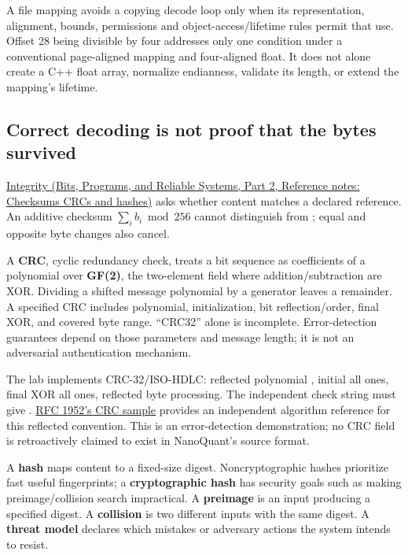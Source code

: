A file mapping avoids a copying decode loop only when its representation, alignment, bounds, permissions and object-access/lifetime rules permit that use. Offset 28 being divisible by four addresses only one condition under a conventional page-aligned mapping and four-aligned float. It does not alone create a C++ float array, normalize endianness, validate its length, or extend the mapping's lifetime.

\subsection{Correct decoding is not proof that the bytes survived}\label{05-engine-i-ch002-correct-decoding-is-not-proof-that-the-bytes-survived}

\hypertarget{05-engine-i-ch002-correct-decoding-is-not-proof-that-the-bytes-survived}{}

\href{../01-Bits-Programs-and-Reliable-Systems-P02/main.pdf\#nameddest=appendix-ed338677de0a}{Integrity (Bits, Programs, and Reliable Systems, Part 2, Reference notes: Checksums CRCs and hashes)} asks whether content matches a declared reference. An additive checksum \(\sum_i b_i\bmod256\) cannot distinguish  from ; equal and opposite byte changes also cancel.

A \textbf{CRC}, cyclic redundancy check, treats a bit sequence as coefficients of a polynomial over \textbf{GF(2)}, the two-element field where addition/subtraction are XOR. Dividing a shifted message polynomial by a generator leaves a remainder. A specified CRC includes polynomial, initialization, bit reflection/order, final XOR, and covered byte range. ``CRC32'' alone is incomplete. Error-detection guarantees depend on those parameters and message length; it is not an adversarial authentication mechanism.

The lab implements CRC-32/ISO-HDLC: reflected polynomial , initial all ones, final XOR all ones, reflected byte processing. The independent check string  must give . \href{https://www.rfc-editor.org/rfc/rfc1952\#section-8}{RFC 1952's CRC sample} provides an independent algorithm reference for this reflected convention. This is an error-detection demonstration; no CRC field is retroactively claimed to exist in NanoQuant's source format.

A \textbf{hash} maps content to a fixed-size digest. Noncryptographic hashes prioritize fast useful fingerprints; a \textbf{cryptographic hash} has security goals such as making preimage/collision search impractical. A \textbf{preimage} is an input producing a specified digest. A \textbf{collision} is two different inputs with the same digest. A \textbf{threat model} declares which mistakes or adversary actions the system intends to resist.

